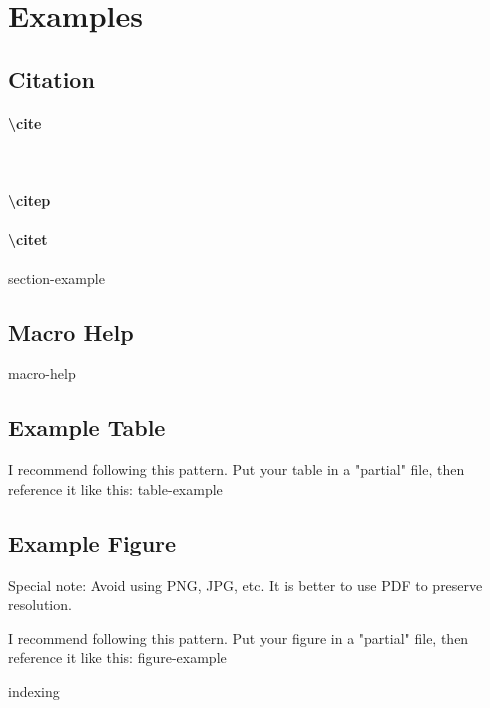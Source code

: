 \chapter{Examples}
\section{Citation}
\subsubsection{\textbackslash cite}
\cite{ombudsman2024machinery} \\

\subsubsection{\textbackslash citep}
\citep{ombudsman2024machinery}

\subsubsection{\textbackslash citet}
\citet{dang2023toward}



{section-example}

\section{Macro Help}
{macro-help}


\section{Example Table}
I recommend following this pattern. Put your table in a "partial" file, then reference it like this:
{table-example}


\section{Example Figure}
Special note: Avoid using PNG, JPG, etc. It is better to use PDF to preserve resolution.

I recommend following this pattern. Put your figure in a "partial" file, then reference it like this:
{figure-example}



{indexing}


